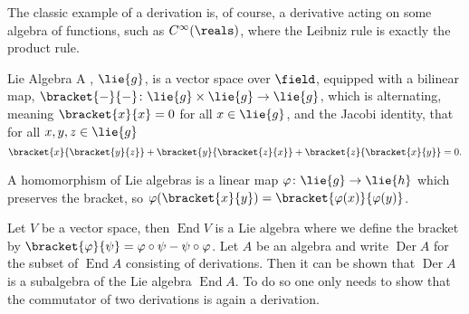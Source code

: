 \documentclass[fleqn]{NotesClass}
\DeclareMathOperator{\Der}{Der}
\newcommand{\derivations}{\Der}
\DeclareMathOperator{\End}{End}
\begin{document}
    The classic example of a derivation is, of course, a derivative acting on some algebra of functions, such as \(C^{\infty}(\reals)\), where the Leibniz rule is exactly the product rule.
    
    \begin{dfn}{Lie Algebra}{}
        A , \(\lie{g}\), is a vector space over \(\field\), equipped with a bilinear map, \(\bracket{-}{-} \colon \lie{g} \times \lie{g} \to \lie{g}\), which is alternating, meaning \(\bracket{x}{x} = 0\) for all \(x \in \lie{g}\), and the Jacobi identity, that for all \(x, y, z \in \lie{g}\)
        \begin{equation}
            \bracket{x}{\bracket{y}{z}} + \bracket{y}{\bracket{z}{x}} + \bracket{z}{\bracket{x}{y}} = 0.
        \end{equation}
        
        A homomorphism of Lie algebras is a linear map \(\varphi \colon \lie{g} \to \lie{h}\) which preserves the bracket, so \(\varphi(\bracket{x}{y}) = \bracket{\varphi(x)}{\varphi(y)}\).
    \end{dfn}
    
    Let \(V\) be a vector space, then \(\End V\) is a Lie algebra where we define the bracket by \(\bracket{\varphi}{\psi} = \varphi \circ \psi - \psi \circ \varphi\).
    Let \(A\) be an algebra and write \(\derivations A\) for the subset of \(\End A\) consisting of derivations.
    Then it can be shown that \(\derivations A\) is a subalgebra of the Lie algebra \(\End A\).
    To do so one only needs to show that the commutator of two derivations is again a derivation.
    
\end{document}
